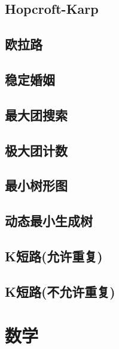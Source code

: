 \documentclass[10pt, a4paper]{article}
\begin{document}
	\subsection{Hopcroft-Karp}
		

	\subsection{欧拉路}
		

	\subsection{稳定婚姻}
		

	\subsection{最大团搜索}
		
	
	\subsection{极大团计数}
		

	\subsection{最小树形图}
		

	\subsection{动态最小生成树}
		

	\subsection{K短路(允许重复)}
		

	\subsection{K短路(不允许重复)}
		

\section{数学}
\end{document}
